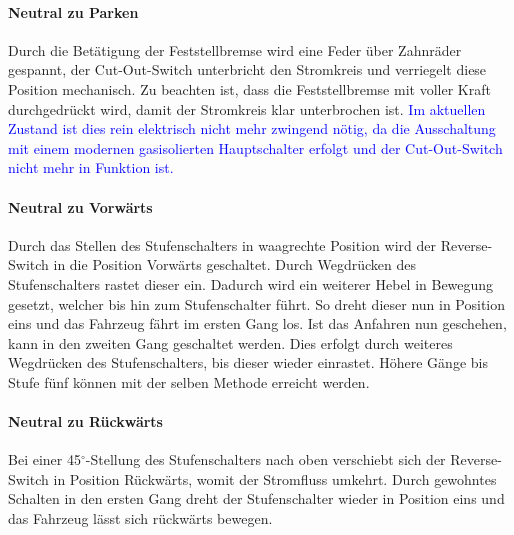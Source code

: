 \paragraph{Neutral zu Parken}
Durch die Betätigung der Feststellbremse wird eine Feder über Zahnräder gespannt, der Cut-Out-Switch unterbricht den Stromkreis und verriegelt diese Position mechanisch. Zu beachten ist, dass die Feststellbremse mit voller Kraft durchgedrückt wird, damit der Stromkreis klar unterbrochen ist. \textcolor{blue}{Im aktuellen Zustand ist dies rein elektrisch nicht mehr zwingend nötig, da die Ausschaltung mit einem modernen gasisolierten Hauptschalter erfolgt und der Cut-Out-Switch nicht mehr in Funktion ist.}

\paragraph{Neutral zu Vorwärts}
Durch das Stellen des Stufenschalters in waagrechte Position wird der Reverse-Switch in die Position Vorwärts geschaltet. Durch Wegdrücken des Stufenschalters rastet dieser ein. Dadurch wird ein weiterer Hebel in Bewegung gesetzt, welcher bis hin zum Stufenschalter führt. So dreht dieser nun in Position eins und das Fahrzeug fährt im ersten Gang los. Ist das Anfahren nun geschehen, kann in den zweiten Gang geschaltet werden. Dies erfolgt durch weiteres Wegdrücken des Stufenschalters, bis dieser wieder einrastet. Höhere Gänge bis Stufe fünf können mit der selben Methode erreicht werden.

\paragraph{Neutral zu Rückwärts}
Bei einer 45$^\circ$-Stellung des Stufenschalters nach oben verschiebt sich der Reverse-Switch in Position Rückwärts, womit der Stromfluss umkehrt. Durch gewohntes Schalten in den ersten Gang dreht der Stufenschalter wieder in Position eins und das Fahrzeug lässt sich rückwärts bewegen.